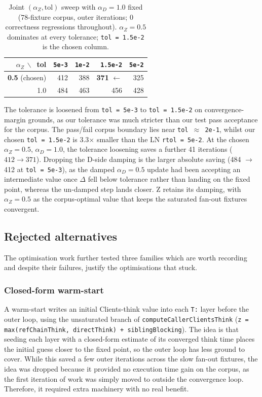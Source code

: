\begin{table}[!ht]\centering
\small
\begin{tabular}{rrrrr}
\hline
$\alpha_Z\,\backslash\,$ tol & \texttt{5e-3} & \texttt{1e-2} & \texttt{1.5e-2} & \texttt{5e-2} \\
\hline
\textbf{0.5} (chosen) & 412 & 388 & \textbf{371} \;$\leftarrow$ & 325 \\
1.0 & 484 & 463 & 456 & 428 \\
\hline
\end{tabular}
\caption{Joint $(\alpha_Z, \text{tol})$ sweep with $\alpha_D = 1.0$ fixed (78-fixture corpus, outer iterations; 0 correctness regressions throughout). $\alpha_Z = 0.5$ dominates at every tolerance; \texttt{tol = 1.5e-2} is the chosen column.}
\label{tab:alpha-tol}
\end{table}

The tolerance is loosened from \texttt{tol = 5e-3} to \texttt{tol = 1.5e-2} on convergence-margin grounds, as our tolerance was much stricter than our test pass acceptance for the corpus. The pass/fail corpus boundary lies near \texttt{tol $\approx$ 2e-1}, whilst our chosen \texttt{tol = 1.5e-2} is 3.3$\times$ smaller than the LN \texttt{rtol = 5e-2}. At the chosen $\alpha_Z = 0.5$, $\alpha_D = 1.0$, the tolerance loosening saves a further 41 iterations ($412 \rightarrow 371$). Dropping the D-side damping is the larger absolute saving (484 $\rightarrow$ 412 at \texttt{tol = 5e-3}), as the damped $\alpha_D = 0.5$ update had been accepting an intermediate value once $\Delta$ fell below tolerance rather than landing on the fixed point, whereas the un-damped step lands closer. Z retains its damping, with $\alpha_Z = 0.5$ as the corpus-optimal value that keeps the saturated fan-out fixtures convergent.

\subsection{Rejected alternatives}

The optimisation work further tested three families which are worth recording and despite their failures, justify the optimisations that stuck.

\subsubsection*{Closed-form warm-start}

A warm-start writes an initial Clients-think value into each \texttt{T:} layer before the outer loop, using the unsaturated branch of \texttt{computeCallerClientsThink} (\texttt{z = max(refChainThink, directThink) + siblingBlocking}). The idea is that seeding each layer with a closed-form estimate of its converged think time places the initial guess closer to the fixed point, so the outer loop has less ground to cover. While this saved a few outer iterations across the slow fan-out fixtures, the idea was dropped because it provided no execution time gain on the corpus, as the first iteration of work was simply moved to outside the convergence loop. Therefore, it required extra machinery with no real benefit.

